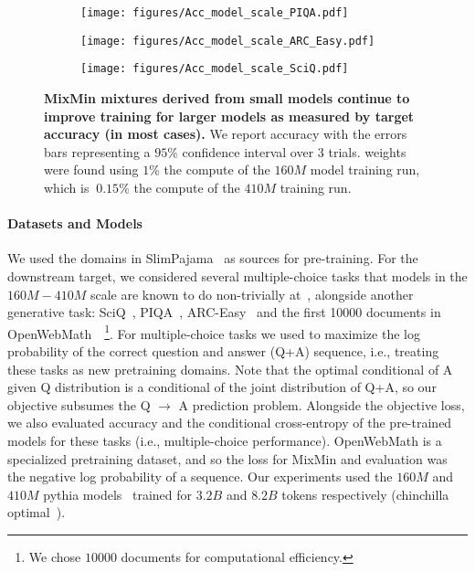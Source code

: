 \begin{figure*}[t!]
\centering
\begin{subfigure}
    \centering
    \texttt{[image: figures/Acc\_model\_scale\_PIQA.pdf]}
\end{subfigure}%
\begin{subfigure}
    \centering
    \texttt{[image: figures/Acc\_model\_scale\_ARC\_Easy.pdf]}
\end{subfigure}
\begin{subfigure}
    \centering
    \texttt{[image: figures/Acc\_model\_scale\_SciQ.pdf]}
\end{subfigure}
\caption{ %
\textbf{MixMin mixtures derived from small models continue to improve training for larger models as measured by target accuracy (in most cases).} %
We report accuracy with the errors bars representing a $95\%$ confidence interval over $3$ trials. \method weights were found using $1\%$ the compute of the $160M$ model training run, which is $~0.15\%$ the compute of the $410M$ training run. %
}
\label{fig:llm_model_scale_res}
\end{figure*}

\paragraph{Datasets and Models} We used the domains in SlimPajama~\citep{cerebras2023slimpajama} as sources for pre-training. For the downstream target, we considered several multiple-choice tasks that models in the $160M-410M$ scale are known to do non-trivially at~\citep{thrush2024improving}, alongside another generative task: SciQ~\citep{Welbl2017CrowdsourcingMC}, PIQA~\citep{bisk2020piqa}, ARC-Easy~\citep{Clark2018ThinkYH} and the first 10000 documents in OpenWebMath~\citep{paster2023openwebmath}~\footnote{We chose $10000$ documents for computational efficiency.}. For multiple-choice tasks we used \method to maximize the log probability of the correct question and answer (Q+A) sequence, i.e., treating these tasks as new pretraining domains. Note that the optimal conditional of A given Q distribution is a conditional of the joint distribution of Q+A, so our objective subsumes the Q $\to$ A prediction problem. Alongside the objective loss, we also evaluated accuracy and the conditional cross-entropy of the pre-trained models for these tasks (i.e., multiple-choice performance). OpenWebMath is a specialized pretraining dataset, and so the loss for MixMin and evaluation was the negative log probability of a sequence. Our experiments used the $160M$ and $410M$ pythia models~\citep{biderman2023pythia} trained for $3.2B$ and $8.2B$ tokens respectively (chinchilla optimal~\citep{hoffmann2022training}).



